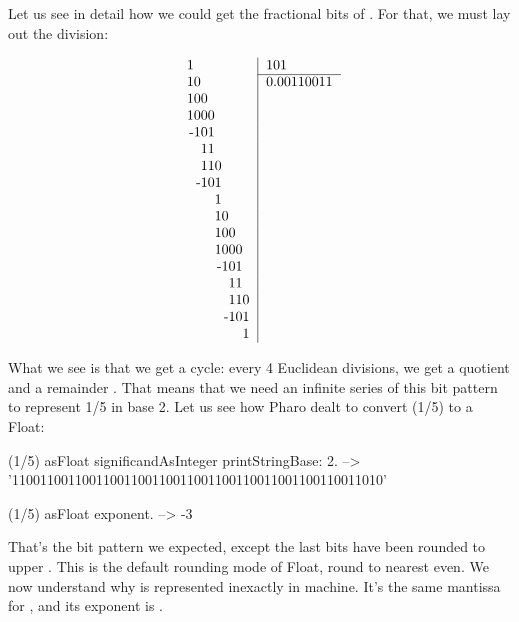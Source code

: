 \documentclass[a4paper,10pt,twoside]{book}
\begin{document}
Let us see in detail how we could get the fractional bits of  \ie \mbox{}. For that, we must lay out the division:

\[
\begin{tabular}{r|l}
\multicolumn{1}{r|}{1\phantom{00000000}} & 101 \\  \cline{2-2}
10\phantom{0000000} & 0.00110011 \\ 
100\phantom{000000}  & \\
1000\phantom{00000}  & \\
-101\phantom{00000}  & \\
   11\phantom{00000}  & \\
   110\phantom{0000} & \\
  -101\phantom{0000} & \\
        1\phantom{0000} & \\
        10\phantom{000} & \\
        100\phantom{00} & \\
        1000\phantom{0} & \\
         -101\phantom{0} & \\
             11\phantom{0} & \\
             110 & \\
            -101 & \\
                  1 & \\
\end{tabular} 
 \]

What we see is that we get a cycle: every 4 Euclidean divisions, we get a quotient  and a remainder . That means that we need an infinite series of this bit pattern  to represent 1/5 in base 2. Let us see how Pharo dealt to convert (1/5) to a Float:


 \begin{code}{}
(1/5) asFloat significandAsInteger printStringBase: 2.
	--> '11001100110011001100110011001100110011001100110011010'
	
(1/5) asFloat exponent.
	--> -3
\end{code}

That's the bit pattern we expected, except the last bits  have been rounded to upper . This is the default rounding mode of Float, round to nearest even. We now understand why  is represented inexactly in machine. It's the same mantissa for , and its exponent is .
\end{document}
